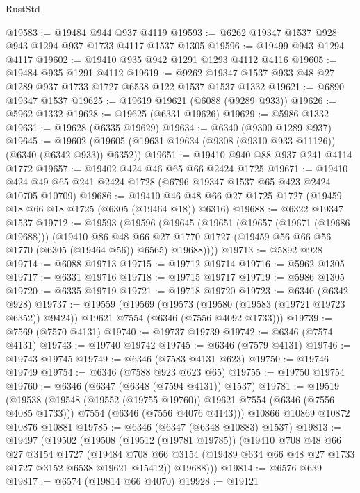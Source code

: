 \begin{lexlean}{RustStd}
\begin{coremodule}
@19583 := @19484 @944 @937 @4119
@19593 := @6262 @19347 @1537 @928 @943 @1294 @937 @1733 @4117 @1537 @1305
@19596 := @19499 @943 @1294 @4117
@19602 := @19410 @935 @942 @1291 @1293 @4112 @4116
@19605 := @19484 @935 @1291 @4112
@19619 := @9262 @19347 @1537 @933 @48 @27 @1289 @937 @1733 @1727 @6538 @122 @1537 @1537 @1332
@19621 := @6890 @19347 @1537
@19625 := @19619 @19621 (@6088 (@9289 @933))
@19626 := @5962 @1332
@19628 := @19625 (@6331 @19626)
@19629 := @5986 @1332
@19631 := @19628 (@6335 @19629)
@19634 := @6340 (@9300 @1289 @937)
@19645 := @19602 (@19605 (@19631 @19634 (@9308 (@9310 @933 @11126)) (@6340 (@6342 @933)) @6352))
@19651 := @19410 @940 @88 @937 @241 @4114 @1772
@19657 := @19402 @424 @46 @65 @66 @2424 @1725
@19671 := @19410 @424 @49 @65 @241 @2424 @1728 (@6796 @19347 @1537 @65 @423 @2424 @10705 @10709)
@19686 := @19410 @46 @48 @66 @27 @1725 @1727 (@19459 @18 @66 @18 @1725 (@6305 (@19464 @18)) @6316)
@19688 := @6322 @19347 @1537
@19712 := @19593
    (@19596
      (@19645
        (@19651
          (@19657 (@19671 (@19686 @19688)))
          (@19410
            @86
            @48
            @66
            @27
            @1770
            @1727
            (@19459 @56 @66 @56 @1770 (@6305 (@19464 @56)) @6565)
            @19688))))
@19713 := @5892 @928
@19714 := @6088 @19713
@19715 := @19712 @19714
@19716 := @5962 @1305
@19717 := @6331 @19716
@19718 := @19715 @19717
@19719 := @5986 @1305
@19720 := @6335 @19719
@19721 := @19718 @19720
@19723 := @6340 (@6342 @928)
@19737 := @19559
    (@19569
      (@19573 (@19580 (@19583 (@19721 @19723 @6352)) @9424))
      @19621
      @7554
      (@6346 (@7556 @4092 @1733)))
@19739 := @7569 (@7570 @4131)
@19740 := @19737 @19739
@19742 := @6346 (@7574 @4131)
@19743 := @19740 @19742
@19745 := @6346 (@7579 @4131)
@19746 := @19743 @19745
@19749 := @6346 (@7583 @4131 @623)
@19750 := @19746 @19749
@19754 := @6346 (@7588 @923 @623 @65)
@19755 := @19750 @19754
@19760 := @6346 (@6347 (@6348 (@7594 @4131)) @1537)
@19781 := @19519
    (@19538
      (@19548 (@19552 (@19755 @19760)) @19621 @7554 (@6346 (@7556 @4085 @1733)))
      @7554
      (@6346 (@7556 @4076 @4143)))
    @10866
    @10869
    @10872
    @10876
    @10881
@19785 := @6346 (@6347 (@6348 @10883) @1537)
@19813 := @19497
    (@19502
      (@19508
        (@19512 (@19781 @19785))
        (@19410
          @708
          @48
          @66
          @27
          @3154
          @1727
          (@19484 @708 @66 @3154 (@19489 @634 @66 @48 @27 @1733 @1727 @3152 @6538 @19621 @15412))
          @19688)))
@19814 := @6576 @639
@19817 := @6574 (@19814 @66 @4070)
@19928 := @19121

\end{coremodule}
\end{lexlean}
